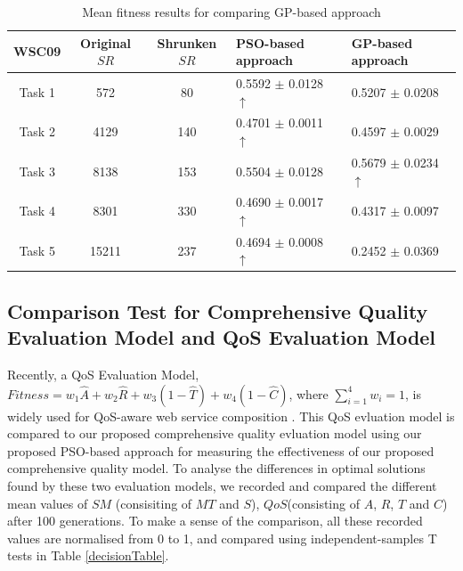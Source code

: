 \documentclass{llncs}
\begin{document}
\begin{table}[]
\centering
\caption{Mean fitness results for comparing GP-based approach}
\label{meanFitness}
\begin{tabular}{c|c|c|l|l}
\hline
\multicolumn{1}{c|}{WSC09} &Original $SR$  &Shrunken $SR$   &PSO-based approach & GP-based approach  \\ \hline
Task 1                     &572            &80    &0.5592 $\pm$ 0.0128  $\uparrow$  &0.5207 $\pm$ 0.0208           \\ \hline
Task 2                     &4129           &140   &0.4701 $\pm$ 0.0011  $\uparrow$  &0.4597 $\pm$ 0.0029          \\ \hline
Task 3                     &8138           &153   &0.5504 $\pm$ 0.0128              &0.5679 $\pm$ 0.0234 $\uparrow$   \\ \hline
Task 4                     &8301           &330   &0.4690 $\pm$ 0.0017  $\uparrow$  &0.4317 $\pm$ 0.0097            \\ \hline
Task 5                     &15211          &237   &0.4694 $\pm$ 0.0008  $\uparrow$  &0.2452 $\pm$ 0.0369            \\ \hline
\end{tabular}
\end{table}



\subsection{Comparison Test for Comprehensive Quality Evaluation Model and QoS Evaluation Model}\label{comparisonTest}

Recently, a QoS Evaluation Model, $Fitness = w_1 \hat{A} + w_2 \hat{R} + w_3(1 - \hat{T}) + w_4(1 - \hat{C})$, where $\sum_{i=1}^{4} w_i = 1$, is widely used for QoS-aware web service composition \cite{ma2015hybrid,da2016particle,da2015graphevol}. This QoS evluation model is compared to our proposed comprehensive quality evluation model using our proposed PSO-based approach for measuring the effectiveness of our proposed comprehensive quality model. To analyse the differences in optimal solutions found by these two evaluation models, we recorded and compared the different mean values of $SM$ (consisiting of $MT$ and $S$), $QoS$(consisting of $A$, $R$, $T$ and $C$) after 100 generations. To make a sense of the comparison, all these recorded values are normalised from 0 to 1, and compared using independent-samples T tests in Table \ref{decisionTable}. 
\end{document}
